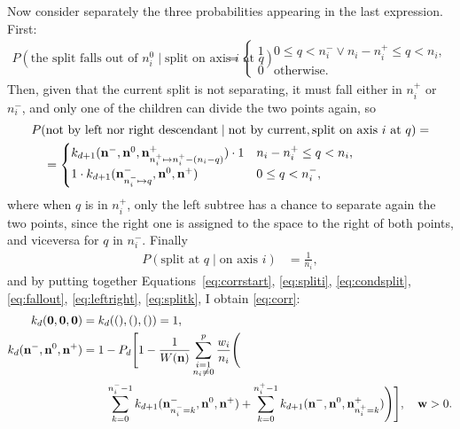 \documentclass[a4paper]{article}
\newcommand{\nvecs}{\mathbf n^-, \mathbf n^0, \mathbf n^+}
\theoremstyle{definition}
\begin{document}
    Now consider separately the three probabilities appearing in the last
    expression. First:
    \begin{align}
        P(\text{the split falls out of $n^0_i$}\mid\text{split on axis $i$ at $q$})
        &= \begin{cases}
            1 & 0 \le q < n^-_i \lor n_i - n^+_i \le q < n_i, \\
            0 & \text{otherwise.}
        \end{cases} \label{eq:fallout}
    \end{align}
    Then, given that the current split is not separating, it must fall either
    in $n^+_i$ or $n^-_i$, and only one of the children can divide the two
    points again, so
    \begin{align}
        &P(\text{not by left nor right descendant}\mid\text{not by current}, \text{split on axis $i$ at $q$}) = \notag \\
        &\quad = \begin{cases}
            k_{d+1}(\mathbf n^-, \mathbf n^0, \mathbf n^+_{n^+_i\mapsto n^+_i-(n_i-q)}) \cdot 1 & n_i - n^+_i \le q < n_i, \\
            1 \cdot k_{d+1}(\mathbf n^-_{n^-_i\mapsto q}, \mathbf n^0, \mathbf n^+) & 0 \le q < n^-_i,
        \end{cases} \label{eq:leftright}
    \end{align}
    where when $q$ is in $n^+_i$, only the left subtree has a chance to
    separate again the two points, since the right one is assigned to the space
    to the right of both points, and viceversa for $q$ in $n^-_i$. Finally
    \begin{align}
        P(\text{split at $q$}\mid\text{on axis $i$})
        &= \frac 1 {n_i}, \label{eq:splitk}
    \end{align}
    and by putting together Equations~\ref{eq:corrstart}, \ref{eq:spliti},
    \ref{eq:condsplit}, \ref{eq:fallout}, \ref{eq:leftright}, \ref{eq:splitk},
    I obtain \autoref{eq:corr}:
    \begin{align}
        k_d(\mathbf 0, \mathbf 0, \mathbf 0) &=
        k_d((),(),()) = 1, \notag \\
        k_d(\nvecs) &= 1 - P_d \Bigg[1 - \frac1{W(\mathbf n)}
            \sum_{\substack{i=1 \\ n_i\ne 0}}^p \frac{w_i}{n_i} \Bigg( \notag \\
                &\qquad \sum_{k=0}^{n^-_i - 1}
                k_{d+1}(\mathbf n^-_{n^-_i=k}, \mathbf n^0, \mathbf n^+)
                + \sum_{k=0}^{n^+_i - 1}
                k_{d+1}(\mathbf n^-, \mathbf n^0, \mathbf n^+_{n^+_i=k})
            \Bigg)
        \Bigg], \quad \mathbf w > 0. \notag
    \end{align}
    
\end{document}
